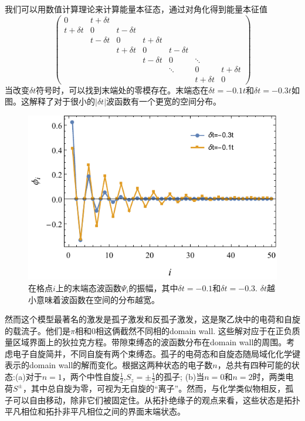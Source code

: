 \documentclass{article}
\numberwithin{equation}{subsection}
\begin{document}
我们可以用数值计算理论来计算能量本征态，通过对角化得到能量本征值
\begin{equation}
    \begin{pmatrix}
        0&t+\delta t&\\
        t+\delta t&0&t-\delta t\\
        \quad&t-\delta t&0&t+\delta t\\
        \quad&\quad&t+\delta t&0&t-\delta t\\
        \quad&\quad&\quad&t-\delta t&0&\ddots&\\
        \quad&\quad&\quad&\quad&\ddots&0&t+\delta t\\
        \quad&\quad&\quad&\quad&\quad&t+\delta t&0
    \end{pmatrix}
\end{equation}
当改变$\delta t$符号时，可以找到末端处的零模存在。末端态在$\delta t=-0.1 t$和$\delta t=-0.3t$如图。这解释了对于很小的$|\delta t|$波函数有一个更宽的空间分布。
\begin{figure}[h]
    \centering
    \includegraphics[width=6in]{SSHFunc.pdf}
    \caption{\footnotesize{在格点$i$上的末端态波函数$\Psi_i$的振幅，其中$\delta t=-0.1$和$\delta t=-0.3$. $\delta t$越小意味着波函数在空间的分布越宽。}}
\end{figure}

然而这个模型最著名的激发是孤子激发和反孤子激发，这是聚乙炔中的电荷和自旋的载流子。他们是$\pi$相和$0$相这俩截然不同相的domain wall. 这些解对应于在正负质量区域界面上的狄拉克方程。带隙束缚态的波函数分布在domain wall的周围。考虑电子自旋简并，不同自旋有两个束缚态。孤子的电荷态和自旋态随局域化化学键表示的domain wall的解而变化。根据这两种状态的电子数$n$，总共有四种可能的状态:(a)对于$n=1$，两个中性自旋$\frac{1}{2}$,$S_z=\pm\frac{1}{2}$的孤子; (b)当$n=0$和$n=2$时，两类电荷$S^{\pm}$，其中总自旋为零，可视为无自旋的“离子”。然而，与化学类似物相反，孤子可以自由移动，除非它们被固定住。从拓扑绝缘子的观点来看，这些状态是拓扑平凡相位和拓扑非平凡相位之间的界面末端状态。
\end{document}
